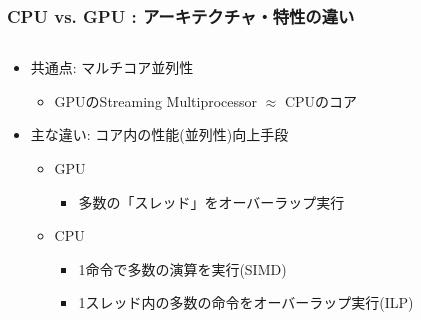 \documentclass[10pt,dvipdfmx]{beamer}
\begin{document}
\begin{frame}
  \frametitle{CPU vs. GPU : アーキテクチャ・特性の違い}
  \begin{columns}
    \begin{column}{0.55\textwidth}
      \begin{itemize}
      \item<1-> 共通点: マルチコア並列性
        \begin{itemize}
        \item GPUのStreaming Multiprocessor $\approx$ CPUのコア
        \end{itemize}
      \item<2-> 主な違い: コア内の性能(並列性)向上手段
        \begin{itemize}
        \item GPU
          \begin{itemize}
          \item 多数の「スレッド」をオーバーラップ実行
          \end{itemize}
        \item CPU
          \begin{itemize}
          \item 1命令で多数の演算を実行(SIMD)
          \item 1スレッド内の多数の命令をオーバーラップ実行(ILP)
          \end{itemize}
        \end{itemize}
      \end{itemize}
    \end{column}
    \begin{column}{0.5\textwidth}
    \end{column}
  \end{columns}
\end{frame}
\end{document}
